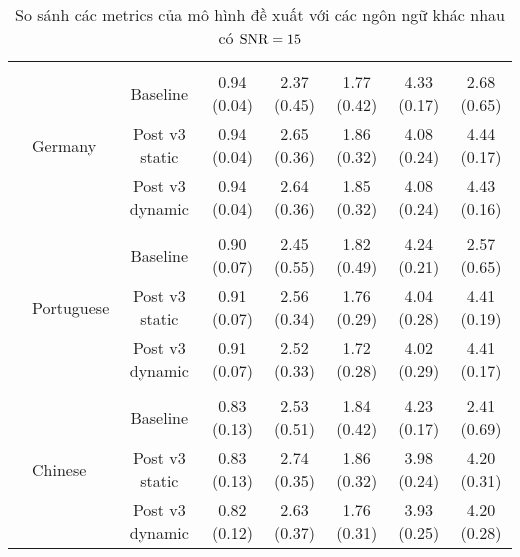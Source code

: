 \begin{sidewaystable}
\begin{subtable}{\textwidth}
\begin{tabular}{llcccccc}
					&&&&&&&\\
					& \multirow{3}{*}{Germany}      &Baseline       & 0.94 (0.04)   & 2.37 (0.45)   & 1.77 (0.42)   & 4.33 (0.17)   & 2.68 (0.65) \\
					&               &Post v3 static & 0.94 (0.04)   & 2.65 (0.36)   & 1.86 (0.32)   & 4.08 (0.24)   & 4.44 (0.17) \\
					&               &Post v3 dynamic        & 0.94 (0.04)   & 2.64 (0.36)   & 1.85 (0.32)   & 4.08 (0.24)   & 4.43 (0.16) \\
					&&&&&&&\\
					& \multirow{3}{*}{Portuguese}   &Baseline       & 0.90 (0.07)   & 2.45 (0.55)   & 1.82 (0.49)   & 4.24 (0.21)   & 2.57 (0.65) \\
					&               &Post v3 static & 0.91 (0.07)   & 2.56 (0.34)   & 1.76 (0.29)   & 4.04 (0.28)   & 4.41 (0.19) \\
					&               &Post v3 dynamic        & 0.91 (0.07)   & 2.52 (0.33)   & 1.72 (0.28)   & 4.02 (0.29)   & 4.41 (0.17) \\
					&&&&&&&\\
					& \multirow{3}{*}{Chinese}      &Baseline       & 0.83 (0.13)   & 2.53 (0.51)   & 1.84 (0.42)   & 4.23 (0.17)   & 2.41 (0.69) \\
					&               &Post v3 static & 0.83 (0.13)   & 2.74 (0.35)   & 1.86 (0.32)   & 3.98 (0.24)   & 4.20 (0.31) \\
					&               &Post v3 dynamic        & 0.82 (0.12)   & 2.63 (0.37)   & 1.76 (0.31)   & 3.93 (0.25)   & 4.20 (0.28) \\
					\hline
				\end{tabular}
				\caption{So sánh các metrics của mô hình đề xuất với các ngôn ngữ khác nhau có $\text{SNR}=15$}
			\end{subtable}
		\end{sidewaystable}
	
		\clearpage
		
